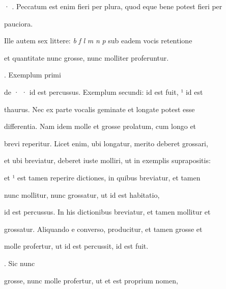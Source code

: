 · . Peccatum est enim fieri per plura, quod eque bene potest fieri per 

\splitlines

pauciora.

\indentK Ille autem sex littere: \textit{b} \textit{f} \textit{l} \textit{m} \textit{n} \textit{p} sub eadem vocis retentione

\newsplitline

et quantitate nunc grosse, nunc molliter proferuntur.

\indentK {}. Exemplum primi

\fulllines


de · ·  id est percussus. Exemplum secundi:   id est fuit, ¹ id est

thaurus. Nec ex parte vocalis geminate et longate potest esse

differentia. Nam idem  molle et grosse prolatum, cum  longo et 

brevi reperitur. Licet enim, ubi  longatur, merito  deberet grossari,

et ubi  breviatur, deberet iuste molliri, ut in exemplis suprapositis:


 et ¹ est tamen reperire dictiones, in quibus  breviatur, et tamen 

nunc mollitur, nunc grossatur, ut  id est habitatio, 

id est percussus. In his dictionibus  breviatur, et tamen  mollitur et

grossatur. Aliquando e converso,  producitur, et tamen  grosse et

\splitlines

molle profertur, ut  id est percussit,   id est fuit.

\indentP {}. Sic  nunc

\fulllines

grosse, nunc molle profertur, ut  et est proprium nomen, 

